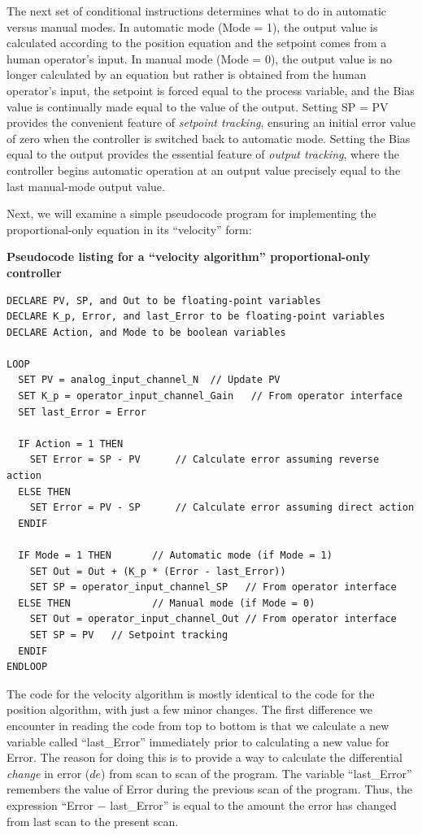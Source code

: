 The next set of conditional instructions determines what to do in automatic versus manual modes.  In automatic mode (Mode = 1), the output value is calculated according to the position equation and the setpoint comes from a human operator's input.  In manual mode (Mode = 0), the output value is no longer calculated by an equation but rather is obtained from the human operator's input, the setpoint is forced equal to the process variable, and the Bias value is continually made equal to the value of the output.  Setting SP = PV provides the convenient feature of \textit{setpoint tracking}, ensuring an initial error value of zero when the controller is switched back to automatic mode.  Setting the Bias equal to the output provides the essential feature of \textit{output tracking}, where the controller begins automatic operation at an output value precisely equal to the last manual-mode output value.

\filbreak

Next, we will examine a simple pseudocode program for implementing the proportional-only equation in its ``velocity'' form:

\vskip 10pt

\textbf{Pseudocode listing for a ``velocity algorithm'' proportional-only controller}

\lstset{language=pseudocode}
\begin{lstlisting}
DECLARE PV, SP, and Out to be floating-point variables
DECLARE K_p, Error, and last_Error to be floating-point variables
DECLARE Action, and Mode to be boolean variables

LOOP
  SET PV = analog_input_channel_N  // Update PV 
  SET K_p = operator_input_channel_Gain   // From operator interface
  SET last_Error = Error

  IF Action = 1 THEN
    SET Error = SP - PV      // Calculate error assuming reverse action
  ELSE THEN
    SET Error = PV - SP      // Calculate error assuming direct action
  ENDIF

  IF Mode = 1 THEN       // Automatic mode (if Mode = 1)
    SET Out = Out + (K_p * (Error - last_Error))
    SET SP = operator_input_channel_SP   // From operator interface
  ELSE THEN              // Manual mode (if Mode = 0)
    SET Out = operator_input_channel_Out // From operator interface 
    SET SP = PV   // Setpoint tracking
  ENDIF
ENDLOOP
\end{lstlisting}

\vskip 10pt

The code for the velocity algorithm is mostly identical to the code for the position algorithm, with just a few minor changes.  The first difference we encounter in reading the code from top to bottom is that we calculate a new variable called ``last\_Error'' immediately prior to calculating a new value for Error.  The reason for doing this is to provide a way to calculate the differential \textit{change} in error ($de$) from scan to scan of the program.  The variable ``last\_Error'' remembers the value of Error during the previous scan of the program.  Thus, the expression ``Error $-$ last\_Error'' is equal to the amount the error has changed from last scan to the present scan.

